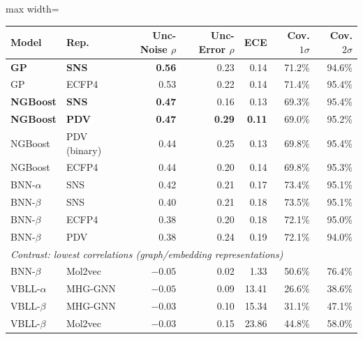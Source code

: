 \begin{table}[htbp]
\centering
\small
\begin{adjustbox}{max width=\textwidth}
\begin{tabular}{llrrrrr}
\toprule
\textbf{Model} & \textbf{Rep.} & \textbf{Unc-Noise $\rho$} & \textbf{Unc-Error $\rho$} & \textbf{ECE} & \textbf{Cov. $1\sigma$} & \textbf{Cov. $2\sigma$} \\
\midrule
\textbf{GP}    & \textbf{SNS}    & \textbf{0.56} & 0.23 & 0.14 & 71.2\% & 94.6\% \\
GP             & ECFP4           & 0.53 & 0.22 & 0.14 & 71.4\% & 95.4\% \\
\textbf{NGBoost} & \textbf{SNS}  & \textbf{0.47} & 0.16 & 0.13 & 69.3\% & 95.4\% \\
\textbf{NGBoost} & \textbf{PDV}  & \textbf{0.47} & \textbf{0.29} & \textbf{0.11} & 69.0\% & 95.2\% \\
NGBoost        & PDV (binary)    & 0.44 & 0.25 & 0.13 & 69.8\% & 95.4\% \\
NGBoost        & ECFP4           & 0.44 & 0.20 & 0.14 & 69.8\% & 95.3\% \\
BNN-$\alpha$   & SNS             & 0.42 & 0.21 & 0.17 & 73.4\% & 95.1\% \\
BNN-$\beta$    & SNS             & 0.40 & 0.21 & 0.18 & 73.5\% & 95.1\% \\
BNN-$\beta$    & ECFP4           & 0.38 & 0.20 & 0.18 & 72.1\% & 95.0\% \\
BNN-$\beta$    & PDV             & 0.38 & 0.24 & 0.19 & 72.1\% & 94.0\% \\
\midrule
\multicolumn{7}{l}{\textit{Contrast: lowest correlations (graph/embedding representations)}} \\
\midrule
BNN-$\beta$ & Mol2vec & $-0.05$ & 0.02 & 1.33 & 50.6\% & 76.4\% \\
VBLL-$\alpha$ & MHG-GNN & $-0.05$ & 0.09 & 13.41 & 26.6\% & 38.6\% \\
VBLL-$\beta$ & MHG-GNN & $-0.03$ & 0.10 & 15.34 & 31.1\% & 47.1\% \\
VBLL-$\beta$ & Mol2vec & $-0.03$ & 0.15 & 23.86 & 44.8\% & 58.0\% \\
\bottomrule
\end{tabular}
\end{adjustbox}

\end{table}
